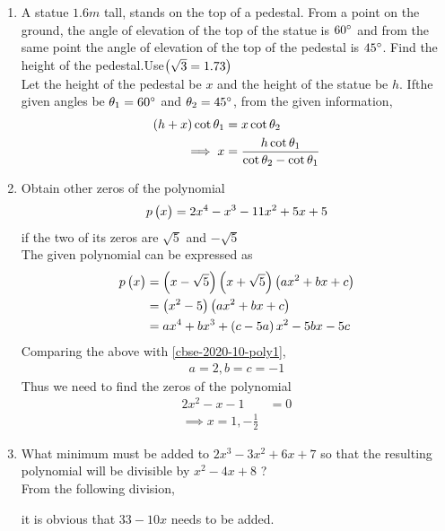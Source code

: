 \documentclass[journal,12pt,twocolumn]{IEEEtran}
\begin{document}
\begin{enumerate}
    \item A statue $1.6m$ tall, stands on the top of a pedestal. From a point on the ground,  the angle of elevation of the top of the statue is $60\degree$ and from the same point the angle of elevation of the top of the pedestal is $45\degree$. Find the height of the pedestal.Use$\begin{pmatrix}\sqrt{3} = 1.73\end{pmatrix}$\\
	    \solution Let the height of the pedestal be $x$ and the height of the statue be $h$. Ifthe given angles be $\theta_1 = 60 \degree$ and $\theta_2 = 45 \degree$,  from the given information, 
\begin{align}
	\left(h + x \right)\cot \theta_1 &= x \cot \theta_2
	\\
	\implies x &= \frac{h\cot \theta_1}{\cot \theta_2-\cot \theta_1}
\end{align}
	    

    
        \item  Obtain other zeros of the polynomial
		\begin{align}
			\label{cbse-2020-10-poly1}
p \begin{pmatrix}x\end{pmatrix} = 2x^4 - x^3 - 11x^2 + 5x + 5
		\end{align}
    if the two of its zeros are $\sqrt{5}$ and $- \sqrt{5}$\\
    \solution The given polynomial can be expressed as
		\begin{align}
			p \begin{pmatrix}x\end{pmatrix} 
			&= \left(x - \sqrt{5}\right)\left(x + \sqrt{5}\right)\left(ax^2 + bx + c \right)
			\\
			&= \left(x^2 - 5\right)\left(ax^2 + bx + c \right)
			\\
			&= ax^4 +bx^3 +\left(c-5a\right)x^2 -5bx -5c
		\end{align}
			Comparing the above with \eqref{cbse-2020-10-poly1}, 
		\begin{align}
			a = 2, b = c = -1
		\end{align}
		Thus we need to find the zeros of the polynomial 
		\begin{align}
			2x^2 -x -1 &= 0
			\\
			\implies x = 1, -\frac{1}{2}
		\end{align}
        \item What minimum must be added to $2x^3 - 3x^2 + 6x + 7$ so that the resulting polynomial will be divisible by $x^2 - 4x + 8$ ?\\
		\solution  From the following division,



it is obvious that $33-10x$ needs to be added.
    \end{enumerate}
\end{document}
